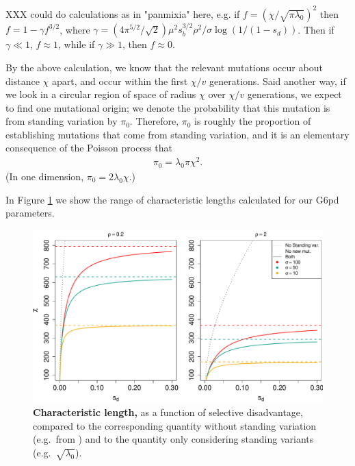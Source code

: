 \documentclass{article}
\begin{document}
XXX could do calculations as in "panmixia" here, e.g. if $f = (\chi/\sqrt{\pi \lambda_0})^2$ then
$f = 1-\gamma f^{3/2}$, where
$\gamma = (4 \pi^{5/2} / \sqrt{2}) \mu^2 s_b^{3/2} \rho^2 / \sigma \log(1/(1-s_d))$.
Then if $\gamma \ll 1$, $f \approx 1$, while if $\gamma \gg 1$, then $f \approx 0$.

By the above calculation, we know that the relevant mutations occur about distance $\chi$ apart, 
and occur within the first $\chi/v$ generations.
Said another way, if we look in a circular region of space of radius $\chi$ over $\chi/v$ generations,
we expect to find one mutational origin;
we denote the probability that this mutation is from standing variation by $\pi_0$.
Therefore, $\pi_0$ is roughly the proportion of establishing mutations that come from standing variation,
and it is an elementary consequence of the Poisson process that
\begin{align} \label{eqn:pizero}
    \pi_0 = \lambda_0 \pi \chi^2 .
\end{align}
(In one dimension, $\pi_0 = 2 \lambda_0 \chi$.)

In Figure \ref{Fig-G6PD-charlength} we show the range of characteristic lengths
calculated for our G6pd parameters.


\begin{figure}[ht]
\begin{center}
  \includegraphics[width=1.0\textwidth]{G6PD_charlengths}   %
\caption{ %
{\bf Characteristic length,} as a function of selective disadvantage, compared to the corresponding quantity without standing variation (e.g.\ from \cite{ralphcoop2010}) and to the quantity only considering standing variants (e.g.\ $\sqrt{\lambda_0}$).
} \label{Fig-G6PD-charlength}
\end{center}
\end{figure}
\end{document}
